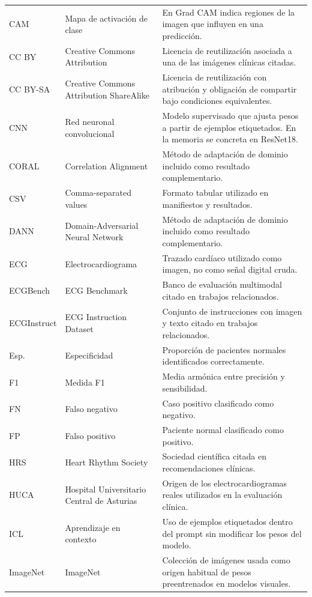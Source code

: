 {\begin{longtable}{@{}>{\raggedright\arraybackslash}p{2.20cm}>{\raggedright\arraybackslash}p{4.10cm}>{\raggedright\arraybackslash}p{7.95cm}@{}}
CAM & Mapa de activación de clase & En Grad CAM indica regiones de la imagen que influyen en una predicción. \\
CC BY & Creative Commons Attribution & Licencia de reutilización asociada a una de las imágenes clínicas citadas. \\
CC BY-SA & Creative Commons Attribution ShareAlike & Licencia de reutilización con atribución y obligación de compartir bajo condiciones equivalentes. \\
CNN & Red neuronal convolucional & Modelo supervisado que ajusta pesos a partir de ejemplos etiquetados. En la memoria se concreta en ResNet18. \\
CORAL & Correlation Alignment & Método de adaptación de dominio incluido como resultado complementario. \\
CSV & Comma-separated values & Formato tabular utilizado en manifiestos y resultados. \\
DANN & Domain-Adversarial Neural Network & Método de adaptación de dominio incluido como resultado complementario. \\
ECG & Electrocardiograma & Trazado cardíaco utilizado como imagen, no como señal digital cruda. \\
ECGBench & ECG Benchmark & Banco de evaluación multimodal citado en trabajos relacionados. \\
ECGInstruct & ECG Instruction Dataset & Conjunto de instrucciones con imagen y texto citado en trabajos relacionados. \\
Esp. & Especificidad & Proporción de pacientes normales identificados correctamente. \\
F1 & Medida F1 & Media armónica entre precisión y sensibilidad. \\
FN & Falso negativo & Caso positivo clasificado como negativo. \\
FP & Falso positivo & Paciente normal clasificado como positivo. \\
HRS & Heart Rhythm Society & Sociedad científica citada en recomendaciones clínicas. \\
HUCA & Hospital Universitario Central de Asturias & Origen de los electrocardiogramas reales utilizados en la evaluación clínica. \\
ICL & Aprendizaje en contexto & Uso de ejemplos etiquetados dentro del prompt sin modificar los pesos del modelo. \\
ImageNet & ImageNet & Colección de imágenes usada como origen habitual de pesos preentrenados en modelos visuales. \\

\end{longtable}}
